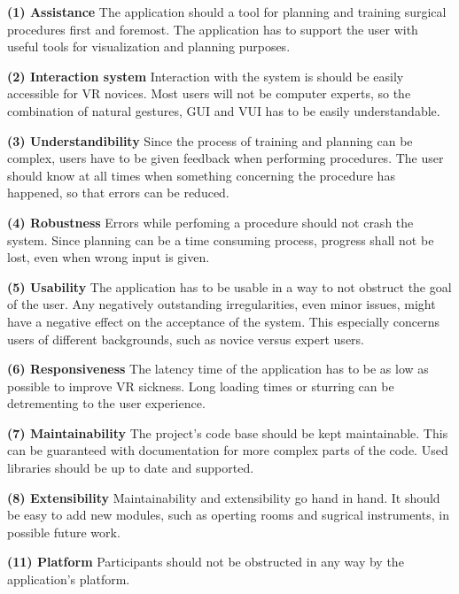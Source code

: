 \begin{compactenum}[label=(\alph*)]
    \item \textbf{(1) Assistance} The application should a tool for planning and training surgical procedures first and foremost.
    The application has to support the user with useful tools for visualization and planning purposes.
    \item \textbf{(2) Interaction system} Interaction with the system is should be easily accessible for VR novices.
    Most users will not be computer experts, so the combination of natural gestures, GUI and VUI has to be easily understandable.
    \item \textbf{(3) Understandibility} Since the process of training and planning can be complex, users have to be given feedback when performing procedures.
    The user should know at all times when something concerning the procedure has happened, so that errors can be reduced.
    \item \textbf{(4) Robustness} Errors while perfoming a procedure should not crash the system.
    Since planning can be a time consuming process, progress shall not be lost, even when wrong input is given.
    \item \textbf{(5) Usability} The application has to be usable in a way to not obstruct the goal of the user.
    Any negatively outstanding irregularities, even minor issues, might have a negative effect on the acceptance of the system.
    This especially concerns users of different backgrounds, such as novice versus expert users.
    \item \textbf{(6) Responsiveness} The latency time of the application has to be as low as possible to improve VR sickness.
    Long loading times or sturring can be detrementing to the user experience.
    \item \textbf{(7) Maintainability} The project’s code base should be kept maintainable.
    This can be guaranteed with documentation for more complex parts of the code.
    Used libraries should be up to date and supported.
    \item \textbf{(8) Extensibility} Maintainability and extensibility go hand in hand.
    It should be easy to add new modules, such as operting rooms and sugrical instruments, in possible future work.
    \item \textbf{(11) Platform} Participants should not be obstructed in any way by the application’s platform.
\end{compactenum}